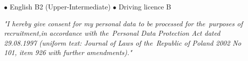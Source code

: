 \documentclass[11pt,a4paper]{article}
\begin{document}
  \bigskip
  
  \medskip
  \centerline{
    \hfill
    $\bullet$ English B2 (Upper-Intermediate)
    \hfill
    $\bullet$ Driving licence B
    \hfill
  }
  
  
  \bigskip
  \noindent \textit{"I hereby give consent for my personal data to be processed for the~purposes
  of recruitment,\linebreak in accordance with the~Personal Data Protection Act dated 29.08.1997
  (uniform text: Journal of Laws of the~Republic of Poland 2002 No 101, item 926
  with further amendments)."}
\end{document}
